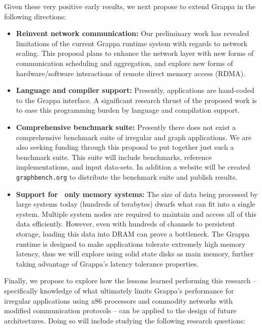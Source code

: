 Given these very positive early results,
we next propose to extend Grappa in the following directions:

\begin{itemize}

\item \textbf{Reinvent network communication:} Our preliminary work has
revealed limitations of the current Grappa runtime system with regards to
network scaling. This proposal plans to enhance the network layer with new
forms of communication scheduling and aggregation, and explore new forms of
hardware/software interactions of remote direct memory access (RDMA).

\item \textbf{Language and compiler support:} Presently, applications are
hand-coded to the Grappa interface. A significant research thrust of the
proposed work is to ease this programming burden by language and compilation
support.

\item \textbf{Comprehensive benchmark suite:} Presently there does not exist a
comprehensive benchmark suite of irregular and graph applications. We are also
seeking funding through this proposal to put together just such a benchmark
suite. This suite will include benchmarks, reference implementations, and
input data-sets. In addition a website will be created \texttt{graphbench.org}
to distribute the benchmark suite and publish results.

\item \textbf{Support for \ssd\ only memory systems:} The size of data being
processed by large systems today (hundreds of terabytes) dwarfs what can fit
into a single system. Multiple system nodes are required to maintain and
access all of this data efficiently. However, even with hundreds of channels
to persistent storage, loading this data into DRAM can prove a bottleneck. The
Grappa runtime is designed to make applications tolerate extremely high memory
latency, thus we will explore using solid state disks as main memory, 
further taking advantage of Grappa's latency tolerance properties.


\end{itemize}

Finally, we propose to explore how the lessons learned performing this research -- specifically knowledge of what ultimately limits Grappa's performance for irregular applications using x86 processors and commodity networks with modified communication protocols -- can be applied to the design of future architectures.  Doing so will include studying the following research questions:

